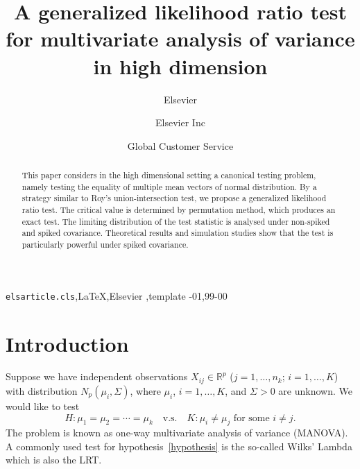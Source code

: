 \documentclass[review]{elsarticle}
\theoremstyle{plain}
\theoremstyle{definition}
\theoremstyle{remark}
\begin{document}
\begin{frontmatter}

\title{A generalized likelihood ratio test for multivariate analysis of variance in high dimension}

\author{Elsevier}
\address{Radarweg 29, Amsterdam}

\author[mymainaddress,mysecondaryaddress]{Elsevier Inc}

\author[mysecondaryaddress]{Global Customer Service}

\address[mymainaddress]{1600 John F Kennedy Boulevard, Philadelphia}
\address[mysecondaryaddress]{360 Park Avenue South, New York}

\begin{abstract}
    This paper considers in the high dimensional setting a canonical testing problem, namely testing the equality of multiple mean vectors of normal distribution.
    By a strategy similar to Roy's union-intersection test, we propose a generalized likelihood ratio test.
    The critical value is determined by permutation method, which produces an exact test.
    The limiting distribution of the test statistic is analysed under non-spiked and spiked covariance.
    Theoretical results and simulation studies show that the test is particularly powerful under spiked covariance.
\end{abstract}

\begin{keyword}
\texttt{elsarticle.cls}\sep \LaTeX\sep Elsevier \sep template
-01\sep  99-00
\end{keyword}

\end{frontmatter}

\linenumbers
\section{Introduction}
Suppose we have independent observations $X_{ij}\in \mathbb{R}^p$ ($j=1,\ldots,n_k$; $i=1,\ldots, K$) with distribution $N_p(\mu_i,\Sigma)$, where $\mu_i$, $i=1,\ldots,K$, and $\Sigma>0$ are unknown. We would like to test
\begin{equation}\label{hypothesis}
    H: \mu_1=\mu_2=\cdots=\mu_k\quad \textrm{v.s.}\quad K: \textrm{$\mu_i\neq \mu_j$ for some $i\neq j$}.
\end{equation}
The problem is known as one-way multivariate analysis of variance (MANOVA).
A commonly used test for hypothesis~\eqref{hypothesis} is the so-called Wilks' Lambda which is also the LRT. 
\end{document}
